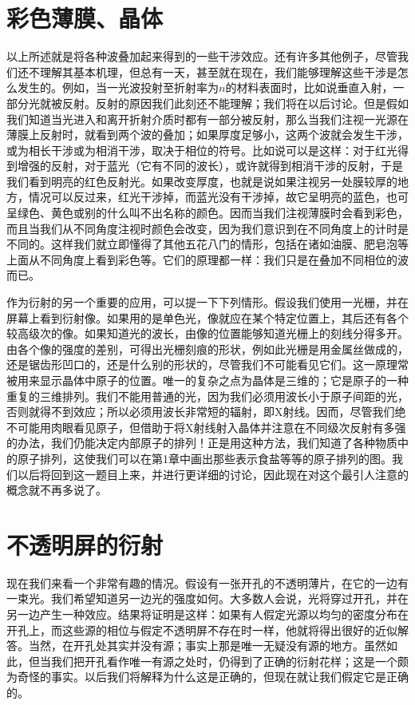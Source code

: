 \section{彩色薄膜、晶体}

以上所述就是将各种波叠加起来得到的一些干涉效应。还有许多其他例子，尽管我们还不理解其基本机理，但总有一天，甚至就在现在，我们能够理解这些干涉是怎么发生的。例如，当一光波投射至折射率为$n$的材料表面时，比如说垂直入射，一部分光就被反射。反射的原因我们此刻还不能理解；我们将在以后讨论。但是假如我们知道当光进入和离开折射介质时都有一部分被反射，那么当我们注视一光源在薄膜上反射时，就看到两个波的叠加；如果厚度足够小，这两个波就会发生干涉，或为相长干涉或为相消干涉，取决于相位的符号。比如说可以是这样：对于红光得到增强的反射，对于蓝光（它有不同的波长），或许就得到相消干涉的反射，于是我们看到明亮的红色反射光。如果改变厚度，也就是说如果注视另一处膜较厚的地方，情况可以反过来，红光干涉掉，而蓝光没有干涉掉，故它呈明亮的蓝色，也可呈绿色、黄色或别的什么叫不出名称的颜色。因而当我们注视薄膜时会看到彩色，而且当我们从不同角度注视时颜色会改变，因为我们意识到在不同角度上的计时是不同的。这样我们就立即懂得了其他五花八门的情形，包括在诸如油膜、肥皂泡等上面从不同角度上看到彩色等。它们的原理都一样：我们只是在叠加不同相位的波而已。

作为衍射的另一个重要的应用，可以提一下下列情形。假设我们使用一光栅，并在屏幕上看到衍射像。如果用的是单色光，像就应在某个特定位置上，其后还有各个较高级次的像。如果知道光的波长，由像的位置能够知道光栅上的刻线分得多开。由各个像的强度的差别，可得出光栅刻痕的形状，例如此光栅是用金属丝做成的，还是锯齿形凹口的，还是什么别的形状的，尽管我们不可能看见它们。这一原理常被用来显示晶体中原子的位置。唯一的复杂之点为晶体是三维的；它是原子的一种重复的三维排列。我们不能用普通的光，因为我们必须用波长小于原子间距的光，否则就得不到效应；所以必须用波长非常短的辐射，即X射线。因而，尽管我们绝不可能用肉眼看见原子，但借助于将X射线射入晶体并注意在不同级次反射有多强的办法，我们仍能决定内部原子的排列！正是用这种方法，我们知道了各种物质中的原子排列，这使我们可以在第1章中画出那些表示食盐等等的原子排列的图。我们以后将回到这一题目上来，并进行更详细的讨论，因此现在对这个最引人注意的概念就不再多说了。

\section{不透明屏的衍射}

现在我们来看一个非常有趣的情况。假设有一张开孔的不透明薄片，在它的一边有一束光。我们希望知道另一边光的强度如何。大多数人会说，光将穿过开孔，并在另一边产生一种效应。结果将证明是这样：如果有人假定光源以均匀的密度分布在开孔上，而这些源的相位与假定不透明屏不存在时一样，他就将得出很好的近似解答。当然，在开孔处其实并没有源；事实上那是唯一无疑没有源的地方。虽然如此，但当我们把开孔看作唯一有源之处时，仍得到了正确的衍射花样；这是一个颇为奇怪的事实。以后我们将解释为什么这是正确的，但现在就让我们假定它是正确的。


